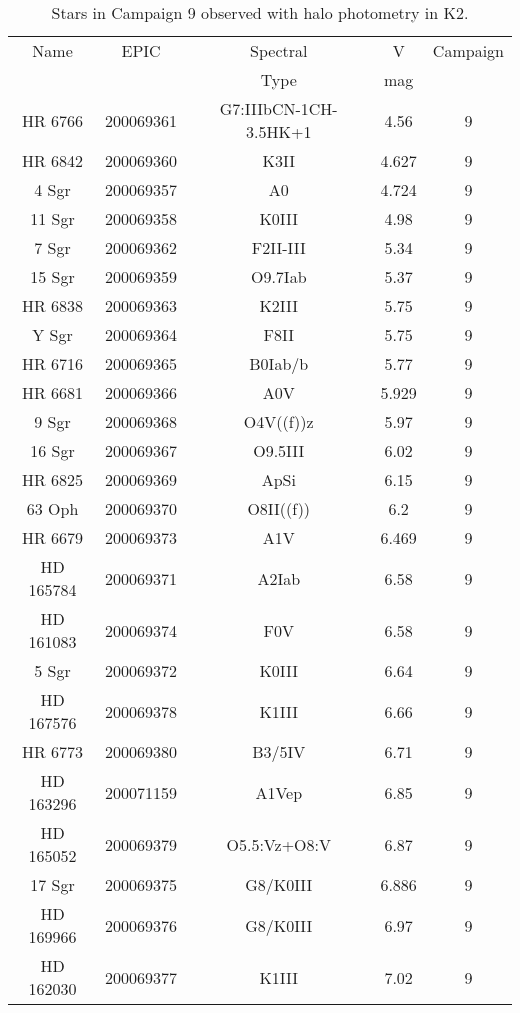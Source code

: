 \begin{table*}
\caption{Stars in Campaign 9 observed with halo photometry in K2.\label{table_1}}
\begin{tabular}{ccccc}
\hline \hline
Name & EPIC & Spectral & V & Campaign \\
 &  & Type & mag &  \\
\hline
HR 6766 & 200069361 & G7:IIIbCN-1CH-3.5HK+1 & 4.56 & 9 \\
HR 6842 & 200069360 & K3II & 4.627 & 9 \\
4 Sgr & 200069357 & A0 & 4.724 & 9 \\
11 Sgr & 200069358 & K0III & 4.98 & 9 \\
7 Sgr & 200069362 & F2II-III & 5.34 & 9 \\
15 Sgr & 200069359 & O9.7Iab & 5.37 & 9 \\
HR 6838 & 200069363 & K2III & 5.75 & 9 \\
Y Sgr & 200069364 & F8II & 5.75 & 9 \\
HR 6716 & 200069365 & B0Iab/b & 5.77 & 9 \\
HR 6681 & 200069366 & A0V & 5.929 & 9 \\
9 Sgr & 200069368 & O4V((f))z & 5.97 & 9 \\
16 Sgr & 200069367 & O9.5III & 6.02 & 9 \\
HR 6825 & 200069369 & ApSi & 6.15 & 9 \\
63 Oph & 200069370 & O8II((f)) & 6.2 & 9 \\
HR 6679 & 200069373 & A1V & 6.469 & 9 \\
HD 165784 & 200069371 & A2Iab & 6.58 & 9 \\
HD 161083 & 200069374 & F0V & 6.58 & 9 \\
5 Sgr & 200069372 & K0III & 6.64 & 9 \\
HD 167576 & 200069378 & K1III & 6.66 & 9 \\
HR 6773 & 200069380 & B3/5IV & 6.71 & 9 \\
HD 163296 & 200071159 & A1Vep & 6.85 & 9 \\
HD 165052 & 200069379 & O5.5:Vz+O8:V & 6.87 & 9 \\
17 Sgr & 200069375 & G8/K0III & 6.886 & 9 \\
HD 169966 & 200069376 & G8/K0III & 6.97 & 9 \\
HD 162030 & 200069377 & K1III & 7.02 & 9 \\
\hline
\end{tabular}
\end{table*}

